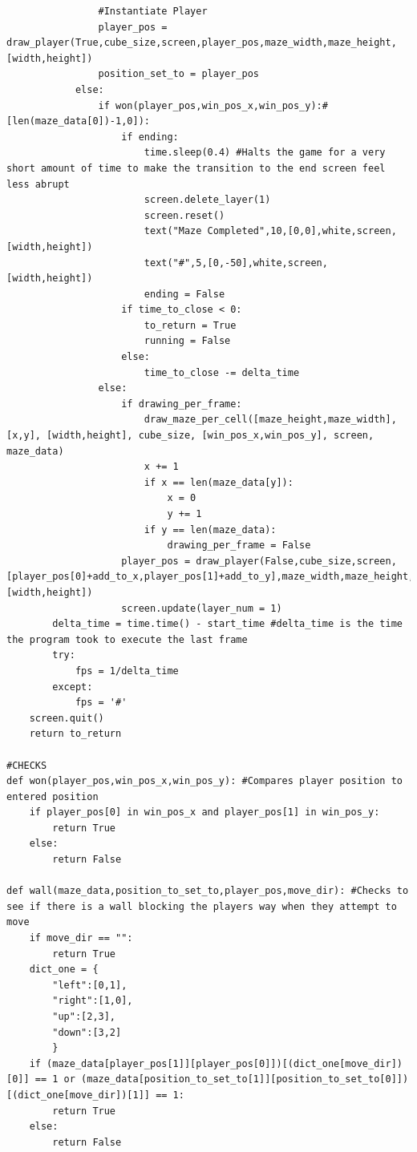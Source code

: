 \documentclass{article}
\begin{document}
\begin{lstlisting}
                #Instantiate Player
                player_pos = draw_player(True,cube_size,screen,player_pos,maze_width,maze_height,[width,height])  
                position_set_to = player_pos
            else:
                if won(player_pos,win_pos_x,win_pos_y):#[len(maze_data[0])-1,0]):
                    if ending:
                        time.sleep(0.4) #Halts the game for a very short amount of time to make the transition to the end screen feel less abrupt
                        screen.delete_layer(1) 
                        screen.reset()                    
                        text("Maze Completed",10,[0,0],white,screen,[width,height])
                        text("#",5,[0,-50],white,screen,[width,height])
                        ending = False
                    if time_to_close < 0:
                        to_return = True
                        running = False
                    else:
                        time_to_close -= delta_time
                else:
                    if drawing_per_frame:
                        draw_maze_per_cell([maze_height,maze_width], [x,y], [width,height], cube_size, [win_pos_x,win_pos_y], screen, maze_data)
                        x += 1
                        if x == len(maze_data[y]):
                            x = 0
                            y += 1
                        if y == len(maze_data):
                            drawing_per_frame = False                  
                    player_pos = draw_player(False,cube_size,screen,[player_pos[0]+add_to_x,player_pos[1]+add_to_y],maze_width,maze_height,[width,height])
                    screen.update(layer_num = 1)
        delta_time = time.time() - start_time #delta_time is the time the program took to execute the last frame
        try:
            fps = 1/delta_time         
        except:
            fps = '#'
    screen.quit()
    return to_return
        
#CHECKS
def won(player_pos,win_pos_x,win_pos_y): #Compares player position to entered position
    if player_pos[0] in win_pos_x and player_pos[1] in win_pos_y:
        return True
    else:
        return False

def wall(maze_data,position_to_set_to,player_pos,move_dir): #Checks to see if there is a wall blocking the players way when they attempt to move
    if move_dir == "":
        return True
    dict_one = {
        "left":[0,1],
        "right":[1,0],
        "up":[2,3],
        "down":[3,2]
        }
    if (maze_data[player_pos[1]][player_pos[0]])[(dict_one[move_dir])[0]] == 1 or (maze_data[position_to_set_to[1]][position_to_set_to[0]])[(dict_one[move_dir])[1]] == 1:
        return True
    else:
        return False


\end{lstlisting}
\end{document}
